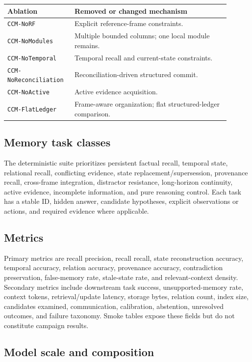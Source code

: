 \begin{longtable}{@{}p{0.25\linewidth}p{0.65\linewidth}@{}}
\toprule
Ablation & Removed or changed mechanism \\
\midrule
\texttt{CCM-NoRF} & Explicit reference-frame constraints. \\
\texttt{CCM-NoModules} & Multiple bounded columns; one local module remains. \\
\texttt{CCM-NoTemporal} & Temporal recall and current-state constraints. \\
\texttt{CCM-NoReconciliation} & Reconciliation-driven structured commit. \\
\texttt{CCM-NoActive} & Active evidence acquisition. \\
\texttt{CCM-FlatLedger} & Frame-aware organization; flat structured-ledger comparison. \\
\bottomrule
\end{longtable}

\subsection{Memory task classes}

The deterministic suite prioritizes persistent factual recall, temporal state, relational recall, conflicting evidence, state replacement/supersession, provenance recall, cross-frame integration, distractor resistance, long-horizon continuity, active evidence, incomplete information, and pure reasoning control. Each task has a stable ID, hidden answer, candidate hypotheses, explicit observations or actions, and required evidence where applicable.

\subsection{Metrics}

Primary metrics are recall precision, recall recall, state reconstruction accuracy, temporal accuracy, relation accuracy, provenance accuracy, contradiction preservation, false-memory rate, stale-state rate, and relevant-context density. Secondary metrics include downstream task success, unsupported-memory rate, context tokens, retrieval/update latency, storage bytes, relation count, index size, candidates examined, communication, calibration, abstention, unresolved outcomes, and failure taxonomy. Smoke tables expose these fields but do not constitute campaign results.

\subsection{Model scale and composition}


